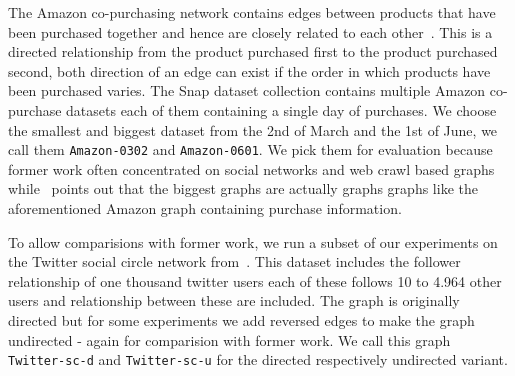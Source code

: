 The Amazon co-purchasing network contains edges between products that have been purchased together and hence are closely related to each other~\cite{snapnets}.
This is a directed relationship from the product purchased first to the product purchased second, both direction of an edge can exist if the order in which
products have been purchased varies.
The Snap dataset collection contains multiple Amazon co-purchase datasets each of them containing a single day of purchases.
We choose the smallest and biggest dataset from the 2nd of March and the 1st of June, we call them \texttt{Amazon-0302} and \texttt{Amazon-0601}.
We pick them for evaluation because former work often concentrated on social networks and web crawl based graphs~\cite{myria-detailed,ammar2018distributed}
while~\cite{salihoglu2018} points out that the biggest graphs are actually graphs graphs like the aforementioned Amazon graph containing purchase information.

To allow comparisions with former work, we run a subset of our experiments on the Twitter social circle network from~\cite{snapnets}.
This dataset includes the follower relationship of one thousand twitter users each of these follows 10 to 4.964 other users and relationship between these are included.
The graph is originally directed but for some experiments we add reversed edges to make the graph undirected - again for comparision with former work.
We call this graph \texttt{Twitter-sc-d} and \texttt{Twitter-sc-u} for the directed respectively undirected variant.
